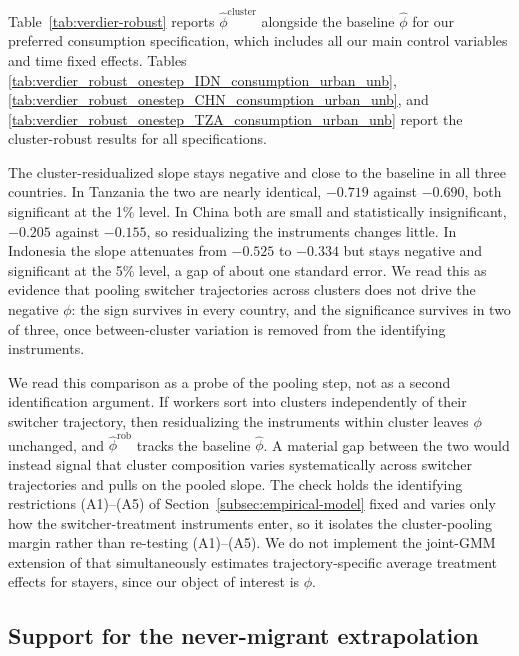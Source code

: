 \documentclass[12pt]{article}
\begin{document}
Table~\ref{tab:verdier-robust} reports $\hat\phi^{\mathrm{cluster}}$ alongside the baseline $\hat\phi$ for our preferred consumption specification, which includes all our main control variables and time fixed effects.
Tables \ref{tab:verdier_robust_onestep_IDN_consumption_urban_unb}, \ref{tab:verdier_robust_onestep_CHN_consumption_urban_unb}, and \ref{tab:verdier_robust_onestep_TZA_consumption_urban_unb} report the cluster-robust results for all specifications. 




The cluster-residualized slope stays negative and close to the baseline in all three countries.
In Tanzania the two are nearly identical, $-0.719$ against $-0.690$, both significant at the 1\% level.
In China both are small and statistically insignificant, $-0.205$ against $-0.155$, so residualizing the instruments changes little.
In Indonesia the slope attenuates from $-0.525$ to $-0.334$ but stays negative and significant at the 5\% level, a gap of about one standard error.
We read this as evidence that pooling switcher trajectories across clusters does not drive the negative $\phi$: the sign survives in every country, and the significance survives in two of three, once between-cluster variation is removed from the identifying instruments.

We read this comparison as a probe of the pooling step, not as a second identification argument.
If workers sort into clusters independently of their switcher trajectory, then residualizing the instruments within cluster leaves $\phi$ unchanged, and $\hat\phi^{\mathrm{rob}}$ tracks the baseline $\hat\phi$.
A material gap between the two would instead signal that cluster composition varies systematically across switcher trajectories and pulls on the pooled slope.
The check holds the identifying restrictions (A1)--(A5) of Section~\ref{subsec:empirical-model} fixed and varies only how the switcher-treatment instruments enter, so it isolates the cluster-pooling margin rather than re-testing (A1)--(A5).
We do not implement the joint-GMM extension of \citet{verdierAverageTreatmentEffects2020a} that simultaneously estimates trajectory-specific average treatment effects for stayers, since our object of interest is $\phi$.


\subsection{Support for the never-migrant extrapolation}\label{subsec:extrapolation-support}
\end{document}
